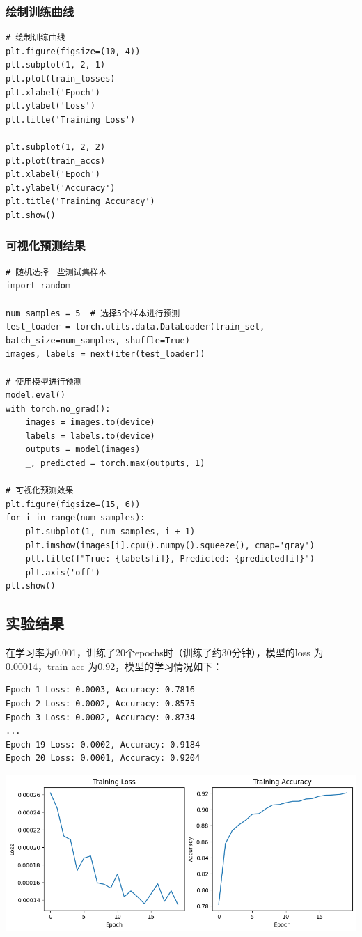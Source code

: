 \documentclass[a4paper,12pt]{article}
\begin{document}
\subsubsection{绘制训练曲线}
\begin{lstlisting}
# 绘制训练曲线
plt.figure(figsize=(10, 4))
plt.subplot(1, 2, 1)
plt.plot(train_losses)
plt.xlabel('Epoch')
plt.ylabel('Loss')
plt.title('Training Loss')

plt.subplot(1, 2, 2)
plt.plot(train_accs)
plt.xlabel('Epoch')
plt.ylabel('Accuracy')
plt.title('Training Accuracy')
plt.show()

\end{lstlisting}

\subsubsection{可视化预测结果}
\begin{lstlisting}
# 随机选择一些测试集样本
import random

num_samples = 5  # 选择5个样本进行预测
test_loader = torch.utils.data.DataLoader(train_set, batch_size=num_samples, shuffle=True)
images, labels = next(iter(test_loader))

# 使用模型进行预测
model.eval()
with torch.no_grad():
    images = images.to(device)
    labels = labels.to(device)
    outputs = model(images)
    _, predicted = torch.max(outputs, 1)

# 可视化预测效果
plt.figure(figsize=(15, 6))
for i in range(num_samples):
    plt.subplot(1, num_samples, i + 1)
    plt.imshow(images[i].cpu().numpy().squeeze(), cmap='gray')
    plt.title(f"True: {labels[i]}, Predicted: {predicted[i]}")
    plt.axis('off')
plt.show()

\end{lstlisting}

\subsection{实验结果}
在学习率为0.001，训练了20个epochs时（训练了约30分钟），模型的loss
为0.00014，train acc 为0.92，模型的学习情况如下：

\begin{lstlisting}
Epoch 1 Loss: 0.0003, Accuracy: 0.7816
Epoch 2 Loss: 0.0002, Accuracy: 0.8575
Epoch 3 Loss: 0.0002, Accuracy: 0.8734
...
Epoch 19 Loss: 0.0002, Accuracy: 0.9184
Epoch 20 Loss: 0.0001, Accuracy: 0.9204
\end{lstlisting}

\centering %
\includegraphics[width=0.8\linewidth]{images/lab2_5_loss.png}
\end{document}

